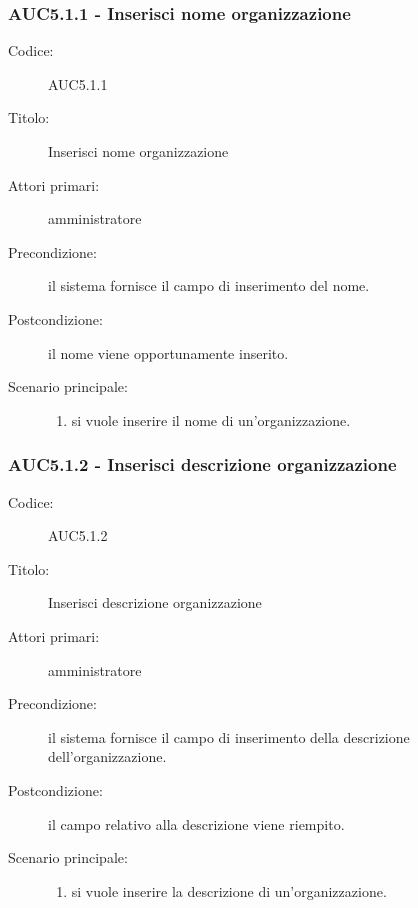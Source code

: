 \documentclass[../../../analisi-dei-requisiti.tex]{subfiles}
\begin{document}
\subsubsection{AUC5.1.1 - Inserisci nome organizzazione}%
  \label{subsub:AUC5.1.1}
  \begin{description}
    \item[Codice:] AUC5.1.1
    \item[Titolo:] Inserisci nome organizzazione
    \item[Attori primari:] amministratore
    \item[Precondizione:] il sistema fornisce il campo di inserimento del nome.
    \item[Postcondizione:] il nome viene opportunamente inserito.
    \item[Scenario principale:]
    \begin{enumerate}
      \item si vuole inserire il nome di un'organizzazione.
    \end{enumerate}

  \end{description}

\subsubsection{AUC5.1.2 - Inserisci descrizione organizzazione}%
  \label{subsub:AUC5.1.2}
  \begin{description}
    \item[Codice:] AUC5.1.2
    \item[Titolo:] Inserisci descrizione organizzazione
    \item[Attori primari:] amministratore
    \item[Precondizione:] il sistema fornisce il campo di inserimento della descrizione dell'organizzazione.
    \item[Postcondizione:] il campo relativo alla descrizione viene riempito.
    \item[Scenario principale:]
    \begin{enumerate}
      \item si vuole inserire la descrizione di un'organizzazione.
    \end{enumerate}
  \end{description}
\end{document}
